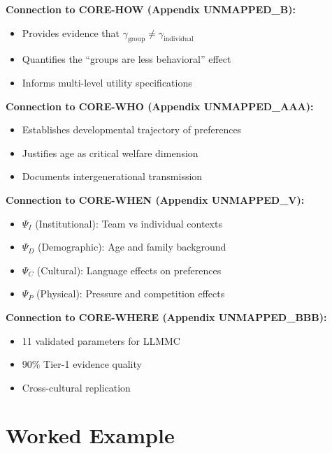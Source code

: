 \begin{tcolorbox}[colback=yellow!5!white, colframe=yellow!75!black,
    title=Integration: LIT-SUTTER $\leftrightarrow$ CORE Appendices]

\textbf{Connection to CORE-HOW (Appendix UNMAPPED_B):}
\begin{itemize}[nosep]
\item Provides evidence that $\gamma_{\text{group}} \neq \gamma_{\text{individual}}$
\item Quantifies the ``groups are less behavioral'' effect
\item Informs multi-level utility specifications
\end{itemize}

\textbf{Connection to CORE-WHO (Appendix UNMAPPED_AAA):}
\begin{itemize}[nosep]
\item Establishes developmental trajectory of preferences
\item Justifies age as critical welfare dimension
\item Documents intergenerational transmission
\end{itemize}

\textbf{Connection to CORE-WHEN (Appendix UNMAPPED_V):}
\begin{itemize}[nosep]
\item $\Psi_I$ (Institutional): Team vs individual contexts
\item $\Psi_D$ (Demographic): Age and family background
\item $\Psi_C$ (Cultural): Language effects on preferences
\item $\Psi_P$ (Physical): Pressure and competition effects
\end{itemize}

\textbf{Connection to CORE-WHERE (Appendix UNMAPPED_BBB):}
\begin{itemize}[nosep]
\item 11 validated parameters for LLMMC
\item 90\% Tier-1 evidence quality
\item Cross-cultural replication
\end{itemize}

\end{tcolorbox}


\section{Worked Example}
\label{sec:su-example}

